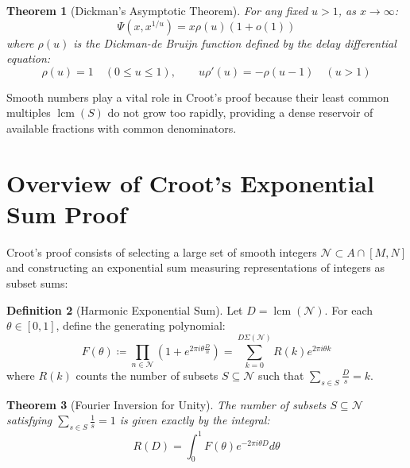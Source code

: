 \documentclass[11pt,a4paper]{article}
\newtheorem{theorem}{Theorem}[section]
\theoremstyle{definition}
\newtheorem{definition}[theorem]{Definition}
\begin{document}
\begin{theorem}[Dickman's Asymptotic Theorem]\label{thm:dickman}
For any fixed $u > 1$, as $x \to \infty$:
\begin{equation}\label{eq:dickman}
\Psi(x, x^{1/u}) = x \rho(u) (1 + o(1))
\end{equation}
where $\rho(u)$ is the Dickman-de Bruijn function defined by the delay differential equation:
\[ \rho(u) = 1 \quad (0 \le u \le 1), \qquad u \rho'(u) = - \rho(u - 1) \quad (u > 1) \]
\end{theorem}

Smooth numbers play a vital role in Croot's proof because their least common multiples $\operatorname{lcm}(S)$ do not grow too rapidly, providing a dense reservoir of available fractions with common denominators.

\section{Overview of Croot's Exponential Sum Proof}

Croot's proof consists of selecting a large set of smooth integers $\mathcal{N} \subset A \cap [M, N]$ and constructing an exponential sum measuring representations of integers as subset sums:

\begin{definition}[Harmonic Exponential Sum]\label{def:exp_sum}
Let $D = \operatorname{lcm}(\mathcal{N})$. For each $\theta \in [0, 1]$, define the generating polynomial:
\begin{equation}\label{eq:croot_gen}
F(\theta) \coloneqq \prod_{n \in \mathcal{N}} \left( 1 + e^{2\pi i \theta \frac{D}{n}} \right) = \sum_{k=0}^{D \Sigma(\mathcal{N})} R(k) e^{2\pi i \theta k}
\end{equation}
where $R(k)$ counts the number of subsets $S \subseteq \mathcal{N}$ such that $\sum_{s \in S} \frac{D}{s} = k$.
\end{definition}

\begin{theorem}[Fourier Inversion for Unity]\label{thm:fourier_inv}
The number of subsets $S \subseteq \mathcal{N}$ satisfying $\sum_{s \in S} \frac{1}{s} = 1$ is given exactly by the integral:
\begin{equation}\label{eq:fourier_int}
R(D) = \int_0^1 F(\theta) e^{- 2\pi i \theta D} d\theta
\end{equation}
\end{theorem}
\end{document}
